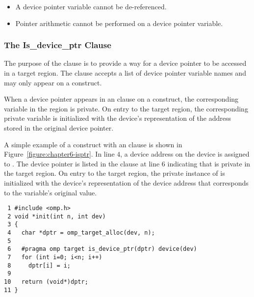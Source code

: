 \begin{itemize}
  \item  A device pointer variable cannot be de-referenced.
  \item  Pointer arithmetic cannot be performed on a device pointer variable.
\end{itemize}

\subsubsection{The Is\_device\_ptr Clause}
\label{ssec:06.is_device_ptr-clause}

The purpose of the  clause is to provide a way for a device
pointer to be accessed in a target region.
The  clause accepts a list of device pointer variable names
and may only appear on a  construct.

When a device pointer appears in an  clause on a
 construct, the corresponding variable in the region is private.
On entry to the target region, the corresponding private variable is
initialized with the device's representation of the address stored in the
original device pointer.

A simple example of a  construct with an 
clause is shown in Figure~\ref{figure:chapter6-isptr}.  In line $4$, a device
address on the  device is assigned to .  The device pointer 
is listed in the  clause at line $6$ indicating that 
is private in the target region.  On entry to the target region, the private instance
of  is initialized with the  device's representation of the device
address that corresponds to the variable's original value.

\begin{figure*}[!tb]
\begin{verbatim}
 1 #include <omp.h>
 2 void *init(int n, int dev)
 3 {
 4   char *dptr = omp_target_alloc(dev, n);
 5 
 6   #pragma omp target is_device_ptr(dptr) device(dev) 
 7   for (int i=0; i<n; i++)
 8     dptr[i] = i;
 9 
10   return (void*)dptr;
11 }
\end{verbatim}
\caption{ \textbf {Example of the is\_device\_ptr clause} -- \small
          The device pointer variable \texttt{dptr} must appear in
          the \texttt{is\_device\_ptr} clause to 
          de-reference it in the target region.
        }
\label{figure:chapter6-isptr}
\end{figure*}

